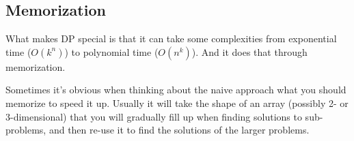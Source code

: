 \subsection{Memorization}

What makes DP special is that it can take some complexities from exponential
time ($O(k^n)$) to polynomial time ($O(n^k)$).
And it does that through memorization.

Sometimes it's obvious when thinking about the naive approach what you should
memorize to speed it up. Usually it will take the shape of an array
(possibly 2- or 3-dimensional) that you will gradually fill up when finding
solutions to sub-problems, and then re-use it to find the solutions of the larger
problems.
